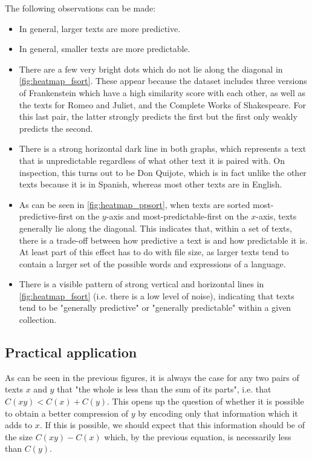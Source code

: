 The following observations can be made:
\begin{itemize}
  \item In general, larger texts are more predictive.
  \item In general, smaller texts are more predictable.
  \item There are a few very bright dots which do not lie along the diagonal in \ref{fig:heatmap_fsort}. These appear because the dataset includes three versions of Frankenstein which have a high similarity score with each other, as well as the texts for Romeo and Juliet, and the Complete Works of Shakespeare. For this last pair, the latter strongly predicts the first but the first only weakly predicts the second.
  \item There is a strong horizontal dark line in both graphs, which represents a text that is unpredictable regardless of what other text it is paired with. On inspection, this turns out to be Don Quijote, which is in fact unlike the other texts because it is in Spanish, whereas most other texts are in English.
  \item As can be seen in \ref{fig:heatmap_ppsort}, when texts are sorted most-predictive-first on the $y$-axis and most-predictable-first on the $x$-axis, texts generally lie along the diagonal. This indicates that, within a set of texts, there is a trade-off between how predictive a text is and how predictable it is. At least part of this effect has to do with file size, as larger texts tend to contain a larger set of the possible words and expressions of a language.
  \item There is a visible pattern of strong vertical and horizontal lines in \ref{fig:heatmap_fsort} (i.e. there is a low level of noise), indicating that texts tend to be "generally predictive" or "generally predictable" within a given collection.
\end{itemize}

\subsection{Practical application}

As can be seen in the previous figures, it is always the case for any two pairs of texts $x$ and $y$ that "the whole is less than the sum of its parts", i.e. that $C(xy) < C(x) + C(y)$. This opens up the question of whether it is possible to obtain a better compression of $y$ by encoding only that information which it adds to $x$. If this is possible, we should expect that this information should be of the size $C(xy) - C(x)$ which, by the previous equation, is necessarily less than $C(y)$.

